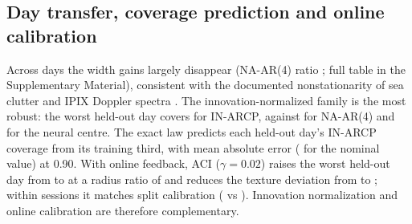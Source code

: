 \documentclass[journal]{IEEEtran}
\begin{document}
\subsection{Day transfer, coverage prediction and online calibration}
Across days the width gains largely disappear (NA-AR(4) ratio \TrRatioNAFour; full table in the Supplementary Material), consistent with the documented nonstationarity of sea clutter and IPIX Doppler spectra \cite{greco2010,rosenberg2017}. The innovation-normalized family is the most robust: the worst held-out day covers \TrWorstINOne{} for IN-ARCP, against \TrWorstNAFour{} for NA-AR(4) and \TrWorstMLP{} for the neural centre. The exact law predicts each held-out day's IN-ARCP coverage from its training third, with mean absolute error \CFiveMaeA{} (\CFiveNaiveA{} for the nominal value) at 0.90. With online feedback, ACI ($\gamma=0.02$) raises the worst held-out day from \ACIWorstSplit{} to \ACIWorst{} at a radius ratio of \ACIRadius{} and reduces the texture deviation from \ACIDevSplit{} to \ACIDev; within sessions it matches split calibration (\ACIWithin{} vs \ACIWithinSplit). Innovation normalization and online calibration are therefore complementary.
\end{document}
